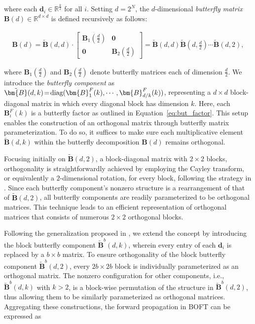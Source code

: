 where each $\bm{d}_i \in \mathbb{R}^{\frac{k}{2}}$ for all $i$. Setting $d=2^N$, the $d$-dimensional \emph{butterfly matrix} $\bm{B}(d)\in\mathbb{R}^{d\times d}$ is defined recursively as follows:

\begin{equation}
\begin{aligned}
    \!\!\bm{B}(d)=\tilde{\bm{B}}(d,d)\!\cdot\!\begin{bmatrix}
    \bm{B}_1(\frac{d}{2})\!\!\!\!\! & \bm{0} \\
    \bm{0}\!\!\!\!\! &\bm{B}_2(\frac{d}{2})
    \end{bmatrix}= \tilde{\bm{B}}(d,d)\tilde{\bm{B}}(d,\frac{d}{2})\cdots\tilde{\bm{B}}(d,2),
\end{aligned}
\end{equation}

where $\bm{B}_1(\frac{d}{2})$ and $\bm{B}_2(\frac{d}{2})$ denote butterfly matrices each of dimension $\frac{d}{2}$. We introduce the \emph{butterfly component} as $\thickmuskip=2mu \medmuskip=2mu \tilde{\bm{B}}(d,k)=\text{diag}(\bm{B}^F_1(k),\cdots,\bm{B}^F_{d/k}(k))$, representing a $d\times d$ block-diagonal matrix in which every diagonal block has dimension $k$. Here, each $\bm{B}^F_i(k)$ is a butterfly factor as outlined in Equation~\ref{eq:but_factor}. This setup enables the construction of an orthogonal matrix through butterfly matrix parameterization. To do so, it suffices to make sure each multiplicative element $\tilde{\bm{B}}(d,k)$ within the butterfly decomposition $\bm{B}(d)$ remains orthogonal. 

Focusing initially on $\tilde{\bm{B}}(d,2)$, a block-diagonal matrix with $2\times 2$ blocks, orthogonality is straightforwardly achieved by employing the Cayley transform, or equivalently a $2$-dimensional rotation, for every block, following the strategy in \cite{liu2021orthogonal,qiu2023controlling}. Since each butterfly component’s nonzero structure is a rearrangement of that of $\tilde{\bm{B}}(d,2)$, all butterfly components are readily parameterized to be orthogonal matrices. This technique leads to an efficient representation of orthogonal matrices that consists of numerous $2\times 2$ orthogonal blocks.

Following the generalization proposed in \cite{chen2022pixelated}, we extend the concept by introducing the block butterfly component $\tilde{\bm{B}}^b(d,k)$, wherein every entry of each $\bm{d}_i$ is replaced by a $b\times b$ matrix. To ensure orthogonality of the block butterfly component $\tilde{\bm{B}}^b(d,2)$, every $2b\times 2b$ block is individually parameterized as an orthogonal matrix. The nonzero configuration for other components, i.e., $\tilde{\bm{B}}^b(d,k)$ with $k>2$, is a block-wise permutation of the structure in $\tilde{\bm{B}}^b(d,2)$, thus allowing them to be similarly parameterized as orthogonal matrices. Aggregating these constructions, the forward propagation in BOFT can be expressed as

